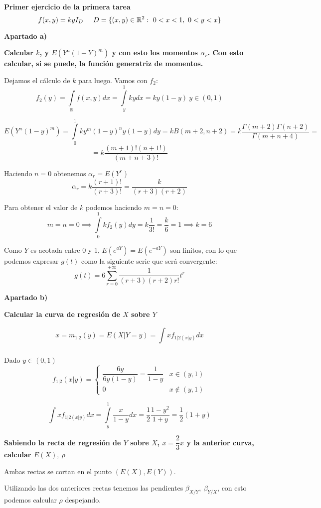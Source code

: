 \documentclass[openany]{book}
\begin{document}
\begin{exercise}
    \textbf{Primer ejercicio de la primera tarea}
    $$ f (x,y) = k y I_{D}\hspace{5mm} D = \{(x,y) \in \mathbb{R}^2:\ 0<x<1,\ 0<y<x\} $$
    
    \begin{flushright}
        \textbf{Apartado a)}
    \end{flushright}
    \textbf{Calcular $ k $, y $ E(Y^{n}(1-Y)^{m}) $ y con esto los momentos $ \alpha_{r} $. Con esto calcular, si se puede, la función generatriz de momentos.}


    Dejamos el cálculo de $ k $ para luego. Vamos con $ f_{2} $:
    $$ f_{2}(y) = \int\limits_{\mathbb{R}}^{}f(x,y)dx = \int\limits_{y}^{1} ky dx = ky(1-y)\ y \in (0,1) $$

    $$ E(Y^{n}(1-y)^{m}) = \int\limits_{0}^{1}k y ^{m}(1-y)^{n} y (1-y)dy = kB(m+2,n+2) = k \dfrac{\Gamma(m+2)\Gamma(n+2)}{\Gamma(m+n+4)} = $$
    $$ = k \dfrac{(m+1)!(n+1!)}{(m+n+3)!} $$

    Haciendo $ n = 0 $ obtenemos $ \alpha_{r} = E(Y^{r}) $
    $$ \alpha_{r} = k \dfrac{(r+1)!}{(r+3)!} = \dfrac{k}{(r+3)(r+2)} $$

    Para obtener el valor de $ k $ podemos haciendo $ m = n = 0 $:
    $$ m = n = 0 \implies \int\limits_{0}^{1}k f_{2}(y)dy = k \dfrac{1}{3!} = \dfrac{k}{6} = 1 \implies k = 6 $$

    Como $ Y $ es acotada entre 0 y 1, $ E(e^{aY}) = E(e^{-aY}) $ son finitos, con lo que podemos expresar $ g(t) $ como la siguiente serie que será convergente:
    $$ g(t) = 6\sum\limits_{r=0}^{+\infty} \dfrac{1}{(r+3)(r+2)r!} t ^{r} $$


    \begin{flushright}
        \textbf{Apartado b)}
    \end{flushright}

    \textbf{Calcular la curva de regresión de $ X $ sobre $ Y $}

    $$ x = m_{1|2}(y) = E(X|Y = y) = \int\limits_{}^{} x f_{1|2(x|y)}dx $$

    Dado $ y \in (0,1) $
    $$ f_{1|2}(x|y) = \left\{
    \begin{array}{lr}
        \dfrac{6y}{6y(1-y)} = \dfrac{1}{1-y} & x \in (y,1)\\ 
        0 & x \not \in (y,1)
    \end{array}
    \right.$$

    $$ \int\limits_{}^{} x f_{1|2(x|y)}dx = \int\limits_{y}^{1} \dfrac{x}{1-y}dx = \dfrac{1}{2} \dfrac{1-y^2}{1+y} = \dfrac{1}{2}(1+y) $$
    
    \begin{flushright}
        \textbf{Sabiendo la recta de regresión de $ Y $ sobre $ X $, $ x = \dfrac{2}{3}x $ y la anterior curva, calcular $ E(X),\ \rho $}
    \end{flushright}

    Ambas rectas se cortan en el punto $ (E(X),E(Y)) $. 

    Utilizando las dos anteriores rectas tenemos las pendientes $ \beta_{X/Y},\ \beta_{Y/X} $, con esto podemos calcular $ \rho $ despejando.


\end{exercise}
\end{document}
